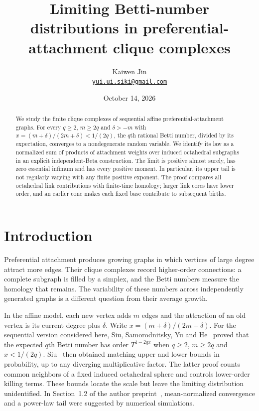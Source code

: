 \documentclass[11pt]{article}
\title{Limiting Betti-number distributions in preferential-attachment clique complexes}
\author{Kaiwen Jin\\\small\href{mailto:yui.ui.siki@gmail.com}{\texttt{yui.ui.siki@gmail.com}}}
\date{October 14, 2026}
\theoremstyle{remark}\newtheorem{remark}[theorem]{Remark}
\begin{document}
\maketitle
\begin{abstract}
We study the finite clique complexes of sequential affine preferential-attachment graphs.
For every $q\ge2$, $m\ge2q$ and $\delta>-m$ with
$x=(m+\delta)/(2m+\delta)<1/(2q)$, the $q$th rational Betti number,
divided by its expectation, converges to a nondegenerate random variable.
We identify its law as a normalized sum of products of attachment weights
over induced octahedral subgraphs in an explicit independent-Beta construction.
The limit is positive almost surely, has zero essential infimum and has every
positive moment. In particular, its upper tail is not regularly varying with
any finite positive exponent. The proof compares all octahedral link
contributions with finite-time homology; larger link cores have lower order,
and an earlier cone makes each fixed base contribute to subsequent births.
\end{abstract}

\section{Introduction}\label{sec:introduction}
Preferential attachment produces growing graphs in which vertices of large
degree attract more edges. Their clique complexes record higher-order
connections: a complete subgraph is filled by a simplex, and the Betti numbers
measure the homology that remains. The variability of these numbers across
independently generated graphs is a different question from their average
growth.

In the affine model, each new vertex adds $m$ edges and the attraction of
an old vertex is its current degree plus $\delta$. Write
$x=(m+\delta)/(2m+\delta)$.
For the sequential version considered here, Siu, Samorodnitsky, Yu and
He~\cite{ssyh} proved that the expected $q$th Betti number has order
$T^{1-2qx}$ when $q\ge2$, $m\ge2q$ and $x<1/(2q)$. Siu~\cite{siu}
then obtained matching upper and lower bounds in probability, up to any
diverging multiplicative factor. The latter proof counts common neighbors of
a fixed induced octahedral sphere and controls lower-order killing terms.
These bounds locate the scale but leave the limiting distribution unidentified.
In Section~1.2 of the author preprint~\cite{siu}, mean-normalized convergence
and a power-law tail were suggested by numerical simulations.
\end{document}
